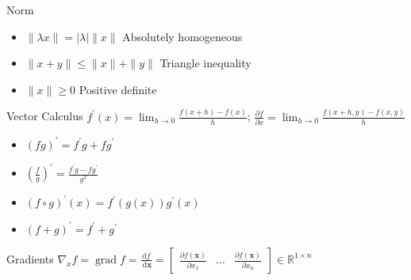 \documentclass[UTF8,a4paper]{article}
\begin{document}
\begin{cheatsheetblock}{Norm}
    \begin{itemize}
        \item $\|\lambda x\|=|\lambda| \|x\|$ \hfill Absolutely homogeneous
        \item $\|x+y\| \leq\|x\|+\|y\|$ \hfill Triangle inequality
        \item $\|x\| \geq 0$ \hfill Positive definite
    \end{itemize}
\end{cheatsheetblock}

\begin{cheatsheetblock} {Vector Calculus}
    $f^{\prime}(x)=\lim _{h \rightarrow 0} \frac{f(x+h)-f(x)}{h}$; \hfill $\frac{\partial f}{\partial x}=\lim _{h \rightarrow 0} \frac{f(x+h, y)-f(x, y)}{h}$

    \begin{itemize}
        \item $(f g)^{\prime}=f^{\prime} g+f g^{\prime}$ \hfill {}
        \item $\left(\frac{f}{g}\right)^{\prime}=\frac{f^{\prime} g-f g^{\prime}}{g^{2}}$ \hfill {}
        \item $(f \circ g)^{\prime}(x)=f^{\prime}(g(x)) g^{\prime}(x)$ \hfill {}
        \item $(f+g)^{\prime}=f^{\prime}+g^{\prime}$ \hfill {}
    \end{itemize}
\end{cheatsheetblock}

\begin{cheatsheetblock}{Gradients}
    $        \nabla_x f=\operatorname{grad} f=\frac{\mathrm{d} f}{\mathrm{~d} \boldsymbol{x}}=\left[\begin{array}{lll}
                \frac{\partial f(\boldsymbol{x})}{\partial x_1} & \ldots & \frac{\partial f(\boldsymbol{x})}{\partial x_n}
            \end{array}\right] \in \mathbb{R}^{1 \times n}$
\end{cheatsheetblock}
\end{document}
